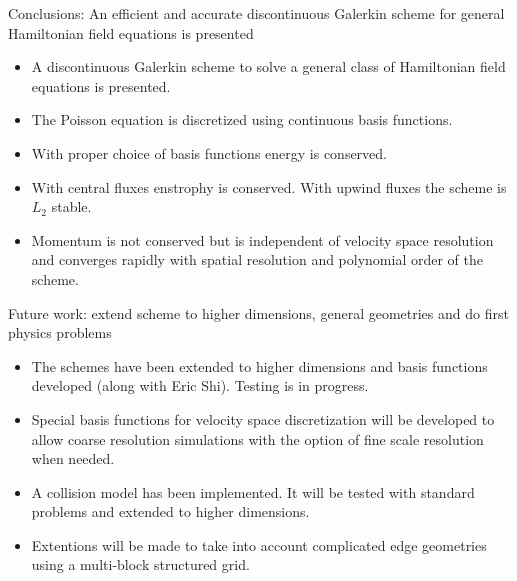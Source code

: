 \documentclass[pdf]{beamer}
\theoremstyle{definition}
\begin{document}
\begin{frame}{Conclusions: An efficient and accurate discontinuous
    Galerkin scheme for general Hamiltonian field equations is
    presented}%

  \begin{itemize}
  \item A discontinuous Galerkin scheme to solve a general class of
    Hamiltonian field equations is presented.
  \item The Poisson equation is discretized using continuous basis
    functions.
  \item With proper choice of basis functions energy is
    conserved. 
  \item With central fluxes enstrophy is conserved. With upwind fluxes
    the scheme is $L_2$ stable.
  \item Momentum is not conserved but is independent of velocity space
    resolution and converges rapidly with spatial resolution and
    polynomial order of the scheme.
  \end{itemize}

\end{frame}

\begin{frame}{Future work: extend scheme to higher dimensions, general
    geometries and do first physics problems}%

  \begin{itemize}
  \item The schemes have been extended to higher dimensions and basis
    functions developed (along with Eric Shi). Testing is in progress.
  \item Special basis functions for velocity space discretization will
    be developed to allow coarse resolution simulations with the
    option of fine scale resolution when needed.
  \item A collision model has been implemented. It will be tested with
    standard problems and extended to higher dimensions.
  \item Extentions will be made to take into account complicated edge
    geometries using a multi-block structured grid.
  \end{itemize}
\end{frame}
\end{document}
